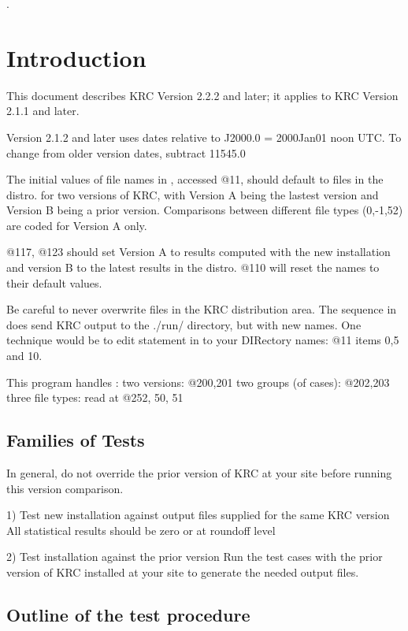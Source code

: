 \documentclass{article}  %
\begin{document}
\hrulefill .\hrulefill

\section{Introduction} 
This document describes KRC Version 2.2.2 and later; it applies to KRC Version
2.1.1 and later.

Version 2.1.2 and later uses dates relative to J2000.0 = 2000Jan01 noon UTC. To
change from older version dates, subtract 11545.0

The initial values of file names in , accessed @11, should default to
files in the distro. for two versions of KRC, with Version A being the lastest
version and Version B being a prior version.  Comparisons between different file
types (0,-1,52) are coded for Version A only.

 @117, @123 should set Version A to results computed with the new installation and
 version B to the latest results in the distro. @110 will reset the names to
 their default values.

Be careful to never overwrite files in the KRC distribution area. The sequence
in  does send KRC output to the ./run/ directory, but with new
names. One technique would be to edit \nv{parf=[...} statement in
   to your DIRectory names: @11 items 0,5 and 10.

This program handles :
\qi two versions:   @200,201
\qi two groups (of cases): @202,203
\qi three file types: read at @252, 50, 51

\subsection{Families of Tests}

\Large
In general, do not override the prior version of KRC at your site before running this version comparison.
\normalsize

1) Test new installation against output files supplied for the same KRC version
\qi All statistical results should be zero or at roundoff level

2) Test installation against the prior version
\qi Run the test cases with the prior version of KRC installed at your site to generate the needed output files.


\subsection{Outline of the test procedure}
\end{document}
